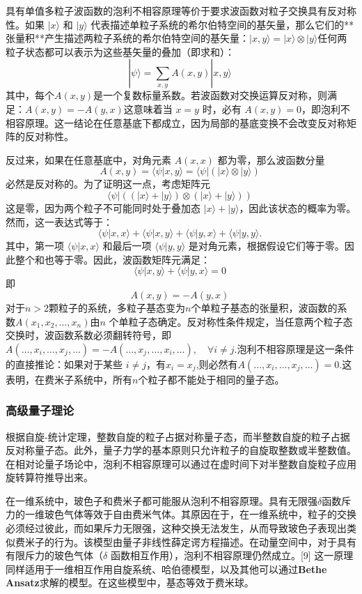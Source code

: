 具有单值多粒子波函数的泡利不相容原理等价于要求波函数对粒子交换具有反对称性。如果 \( |x\rangle \) 和 \( |y\rangle \) 代表描述单粒子系统的希尔伯特空间的基矢量，那么它们的**张量积**产生描述两粒子系统的希尔伯特空间的基矢量：\(|x, y\rangle = |x\rangle \otimes |y\rangle\)任何两粒子状态都可以表示为这些基矢量的叠加（即求和）：  
\[
|\psi\rangle = \sum_{x,y} A(x,y) |x,y\rangle~
\]
其中，每个\(A(x, y)\)是一个复数标量系数。若波函数对交换运算反对称，则满足：\(A(x, y) = -A(y, x)\)这意味着当 \( x = y \) 时，必有 \( A(x, y) = 0 \)，即泡利不相容原理。这一结论在任意基底下都成立，因为局部的基底变换不会改变反对称矩阵的反对称性。

反过来，如果在任意基底中，对角元素 \( A(x, x) \) 都为零，那么波函数分量  
\[
A(x, y) = \langle \psi | x, y \rangle = \langle \psi | ( |x\rangle \otimes |y\rangle )~
\]
必然是反对称的。为了证明这一点，考虑矩阵元  
\[
\langle \psi | ( (|x\rangle + |y\rangle ) \otimes (|x\rangle + |y\rangle ) )~
\]
这是零，因为两个粒子不可能同时处于叠加态 \( |x\rangle + |y\rangle \)，因此该状态的概率为零。然而，这一表达式等于：  
\[
\langle \psi | x, x \rangle + \langle \psi | x, y \rangle + \langle \psi | y, x \rangle + \langle \psi | y, y \rangle.~
\]
其中，第一项 \( \langle \psi | x, x \rangle \) 和最后一项 \( \langle \psi | y, y \rangle \) 是对角元素，根据假设它们等于零。因此整个和也等于零。因此，波函数矩阵元满足：  
\[
\langle \psi | x, y \rangle + \langle \psi | y, x \rangle = 0~
\]
即  
\[
A(x, y) = -A(y, x)~
\]
对于\( n > 2 \)颗粒子的系统，多粒子基态变为\( n \)个单粒子基态的张量积，波函数的系数\(A(x_1, x_2, \dots, x_n)\)由\( n \) 个单粒子态确定。反对称性条件规定，当任意两个粒子态交换时，波函数系数必须翻转符号，即\(A(\dots, x_i, \dots, x_j, \dots) = -A(\dots, x_j, \dots, x_i, \dots), \quad \forall i \neq j\).泡利不相容原理是这一条件的直接推论：如果对于某些 \( i \neq j \)，有\(x_i = x_j\),则必然有\(A(\dots, x_i, \dots, x_j, \dots) = 0\).这表明，在费米子系统中，所有\( n \)个粒子都不能处于相同的量子态。
\subsubsection{高级量子理论} 
根据自旋-统计定理，整数自旋的粒子占据对称量子态，而半整数自旋的粒子占据反对称量子态。此外，量子力学的基本原则只允许粒子的自旋取整数或半整数值。在相对论量子场论中，泡利不相容原理可以通过在虚时间下对半整数自旋粒子应用旋转算符推导出来。

在一维系统中，玻色子和费米子都可能服从泡利不相容原理。具有无限强\(\delta\)函数斥力的一维玻色气体等效于自由费米气体。其原因在于，在一维系统中，粒子的交换必须经过彼此，而如果斥力无限强，这种交换无法发生，从而导致玻色子表现出类似费米子的行为。该模型由量子非线性薛定谔方程描述。在动量空间中，对于具有有限斥力的玻色气体（\(\delta\) 函数相互作用），泡利不相容原理仍然成立。[9] 这一原理同样适用于一维相互作用自旋系统、哈伯德模型，以及其他可以通过\textbf{Bethe Ansatz}求解的模型。在这些模型中，基态等效于费米球。
